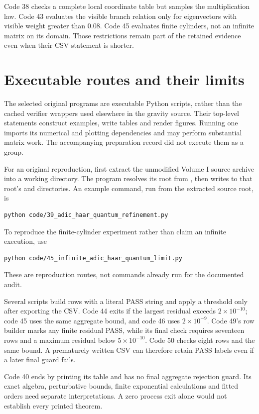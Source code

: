 Code 38 checks a complete local coordinate table but samples the multiplication law. Code 43 evaluates the visible branch relation only for eigenvectors with visible weight greater than \(0.08\). Code 45 evaluates finite cylinders, not an infinite matrix on its domain. Those restrictions remain part of the retained evidence even when their CSV statement is shorter.

\clearpage
\section{Executable routes and their limits}\label{a-verify-executables}

The selected original programs are executable Python scripts, rather than the cached verifier wrappers used elsewhere in the gravity source. Their top-level statements construct examples, write tables and render figures. Running one imports its numerical and plotting dependencies and may perform substantial matrix work. The accompanying preparation record did not execute them as a group.

For an original reproduction, first extract the unmodified Volume I source archive into a working directory. The program resolves its root from , then writes to that root's  and  directories. An example command, run from the extracted source root, is
\begin{lstlisting}
python code/39_adic_haar_quantum_refinement.py
\end{lstlisting}
To reproduce the finite-cylinder experiment rather than claim an infinite execution, use
\begin{lstlisting}
python code/45_infinite_adic_haar_quantum_limit.py
\end{lstlisting}
These are reproduction routes, not commands already run for the documented audit.

Several scripts build rows with a literal PASS string and apply a threshold only after exporting the CSV. Code 44 exits if the largest residual exceeds \(2\times10^{-10}\); code 45 uses the same aggregate bound, and code 46 uses \(2\times10^{-9}\). Code 49's row builder marks any finite residual PASS, while its final check requires seventeen rows and a maximum residual below \(5\times10^{-10}\). Code 50 checks eight rows and the same bound. A prematurely written CSV can therefore retain PASS labels even if a later final guard fails.

Code 40 ends by printing its table and has no final aggregate rejection guard. Its exact algebra, perturbative bounds, finite exponential calculations and fitted orders need separate interpretations. A zero process exit alone would not establish every printed theorem.

